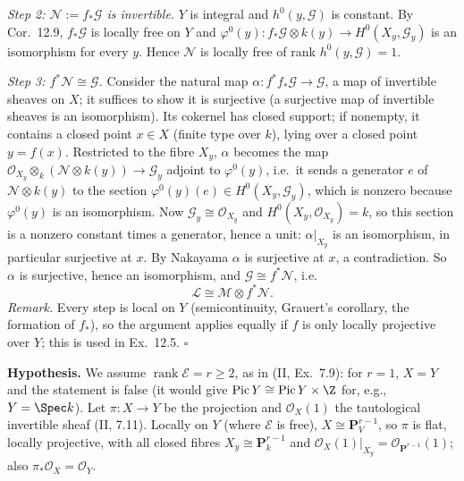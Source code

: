 \documentclass[11pt]{article}
\begin{document}
\emph{Step 2: $\mathcal N:=f_*\mathcal G$ is invertible.} $Y$ is integral and $h^0(y,\mathcal G)$ is constant. By Cor.~12.9, $f_*\mathcal G$ is locally free on $Y$ and $\varphi^0(y)\colon f_*\mathcal G\otimes k(y)\to H^0(X_y,\mathcal G_y)$ is an isomorphism for every $y$. Hence $\mathcal N$ is locally free of rank $h^0(y,\mathcal G)=1$.

\emph{Step 3: $f^*\mathcal N\cong\mathcal G$.} Consider the natural map $\alpha\colon f^*f_*\mathcal G\to\mathcal G$, a map of invertible sheaves on $X$; it suffices to show it is surjective (a surjective map of invertible sheaves is an isomorphism). Its cokernel has closed support; if nonempty, it contains a closed point $x\in X$ (finite type over $k$), lying over a closed point $y=f(x)$. Restricted to the fibre $X_y$, $\alpha$ becomes the map $\mathcal O_{X_y}\otimes_k(\mathcal N\otimes k(y))\to\mathcal G_y$ adjoint to $\varphi^0(y)$, i.e.\ it sends a generator $e$ of $\mathcal N\otimes k(y)$ to the section $\varphi^0(y)(e)\in H^0(X_y,\mathcal G_y)$, which is nonzero because $\varphi^0(y)$ is an isomorphism. Now $\mathcal G_y\cong\mathcal O_{X_y}$ and $H^0(X_y,\mathcal O_{X_y})=k$, so this section is a nonzero constant times a generator, hence a unit: $\alpha|_{X_y}$ is an isomorphism, in particular surjective at $x$. By Nakayama $\alpha$ is surjective at $x$, a contradiction. So $\alpha$ is surjective, hence an isomorphism, and $\mathcal G\cong f^*\mathcal N$, i.e.
\[
\mathcal L\cong\mathcal M\otimes f^*\mathcal N .
\]
\emph{Remark.} Every step is local on $Y$ (semicontinuity, Grauert's corollary, the formation of $f_*$), so the argument applies equally if $f$ is only locally projective over $Y$; this is used in Ex.~12.5. \hfill$\square$

\pf
\textbf{Hypothesis.} We assume $\operatorname{rank}\mathcal E=r\ge2$, as in (II, Ex.~7.9): for $r=1$, $X=Y$ and the statement is false (it would give $\operatorname{Pic}Y\cong\operatorname{Pic}Y\times\Z$ for, e.g., $Y=\Spec k$). Let $\pi\colon X\to Y$ be the projection and $\mathcal O_X(1)$ the tautological invertible sheaf (II, 7.11). Locally on $Y$ (where $\mathcal E$ is free), $X\cong\mathbf P^{r-1}_V$, so $\pi$ is flat, locally projective, with all closed fibres $X_y\cong\mathbf P^{r-1}_k$ and $\mathcal O_X(1)|_{X_y}=\mathcal O_{\mathbf P^{r-1}}(1)$; also $\pi_*\mathcal O_X=\mathcal O_Y$.
\end{document}

